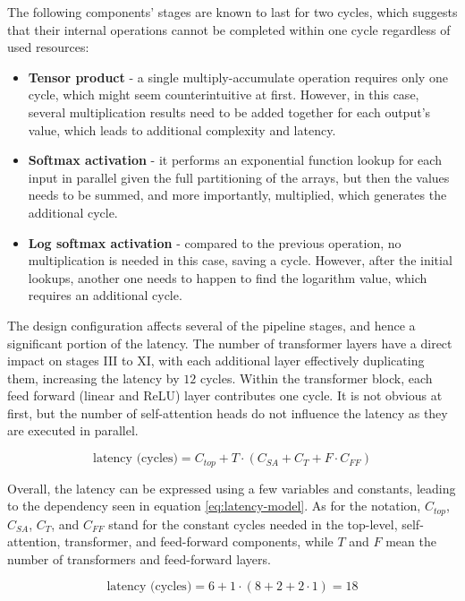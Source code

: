 \newpage
The following components' stages are known to last for two cycles, which suggests that their internal operations cannot be completed within one cycle regardless of used resources:

\begin{itemize}
  \item \textbf{Tensor product} - a single multiply-accumulate operation requires only one cycle, which might seem counterintuitive at first. However, in this case, several multiplication results need to be added together for each output's value, which leads to additional complexity and latency.
  \item \textbf{Softmax activation} - it performs an exponential function lookup for each input in parallel given the full partitioning of the arrays, but then the values needs to be summed, and more importantly, multiplied, which generates the additional cycle.
  \item \textbf{Log softmax activation} - compared to the previous operation, no multiplication is needed in this case, saving a cycle. However, after the initial lookups, another one needs to happen to find the logarithm value, which requires an additional cycle.
\end{itemize}

The design configuration affects several of the pipeline stages, and hence a significant portion of the latency. The number of transformer layers  have a direct impact on stages III to XI, with each additional layer effectively duplicating them, increasing the latency by \(12\) cycles. Within the transformer block, each feed forward (linear and ReLU) layer contributes one cycle. It is not obvious at first, but the number of self-attention heads do not influence the latency as they are executed in parallel.

\begin{equation} \label{eq:latency-model}
  \text{latency (cycles)} = C_{top} + T \cdot ( C_{SA} + C_{T} + F \cdot C_{FF} )
\end{equation}

Overall, the latency can be expressed using a few variables and constants, leading to the dependency seen in equation \ref{eq:latency-model}. As for the notation, \(C_{top}\), \(C_{SA}\), \(C_{T}\), and \(C_{FF}\) stand for the constant cycles needed in the top-level, self-attention, transformer, and feed-forward components, while \(T\) and \(F\) mean the number of transformers and feed-forward layers.

\begin{equation} \label{eq:latency-model-numbers}
  \text{latency (cycles)} = 6 + 1 \cdot ( 8 + 2 + 2 \cdot 1 ) = 18
\end{equation}

